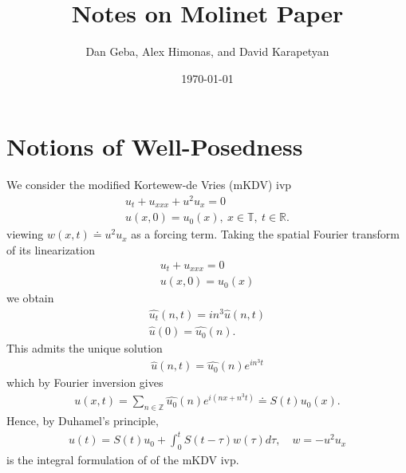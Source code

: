 \documentclass[12pt,reqno]{amsart}
\numberwithin{equation}{section}  %
\newcommand{\rr}{\mathbb{R}}
\newcommand{\zz}{\mathbb{Z}}
\newcommand{\ci}{\mathbb{T}}
\newcommand{\wh}{\widehat}
\begin{document}
\title{Notes on Molinet Paper}
\author{Dan Geba, Alex Himonas, and David Karapetyan}
\address{Department of Mathematics  \\
    University  of Notre Dame\\
        Notre Dame, IN 46556 }
        \date{\today}
        \maketitle
        \section{Notions of Well-Posedness}
        We consider the modified 
        Kortewew-de Vries (mKDV) ivp
        \begin{gather}
          \label{mkdv}
          u_{t} + u_{xxx} + u^{2} u_{x} = 0
          \\
          u(x,0) = u_{0}(x), \ x \in \ci, \ t \in \rr.
          \label{mkdv-init}
        \end{gather}
        viewing $w(x,t) \doteq u^{2} u_{x}$ as a forcing term.
        Taking the spatial Fourier transform of its linearization
        \begin{gather*}
          \label{lin-mkdv}
          u_{t} + u_{xxx} =0
          \\
          u(x,0) = u_{0}(x)
          \label{lin-mkdv-init}
        \end{gather*}
 we obtain
 \begin{equation*}
 \begin{split}
   \wh{u_{t}}(n, t) =  i n^{3}\wh{u}(n,t) 
   \\
   \wh{u}(0) = \wh{u_{0}}(n).
 \end{split}
 \end{equation*}
 This admits the unique solution
 \begin{equation*}
 \begin{split}
   \wh{u}(n,t) = \wh{u_{0}}(n) e^{i n^{3}t}
 \end{split}
 \end{equation*}
 which by Fourier inversion gives
 \begin{equation*}
 \begin{split}
   u(x,t) = \sum_{n \in \zz} \wh{u_{0}}(n) e^{i\left( nx + n^{3}t \right)} \doteq S(t)u_{0}(x).  \end{split}
 \end{equation*}
Hence, by Duhamel's principle, 
%
%
\begin{equation}
  \label{int-reform-mkdv}
\begin{split}
  u(t) = S(t)u_{0} + \int_{0}^{t} S(t- \tau) w(\tau) d \tau, \quad w =
  -u^{2}u_{x}
\end{split}
\end{equation}
%
%
is the integral formulation of of the mKDV ivp. 
\end{document}

